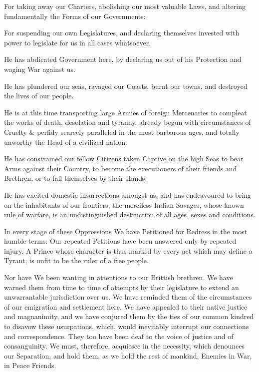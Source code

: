 \documentclass[a4paper,landscape,10pt]{article}
\begin{document}
For taking away our Charters,
abolishing our most valuable Laws,
and altering fundamentally the Forms of our Governments:

For suspending our own Legislatures,
and declaring themselves invested with power to legislate for us in all cases whatsoever.

He has abdicated Government here,
by declaring us out of his Protection and waging War against us.

He has plundered our seas,
ravaged our Coasts,
burnt our towns,
and destroyed the lives of our people.

He is at this time transporting large Armies of foreign Mercenaries
to compleat the works of death, desolation and tyranny,
already begun with circumstances of Cruelty \& perfidy
scarcely paralleled in the most barbarous ages,
and totally unworthy the Head of a civilized nation.

He has constrained our fellow Citizens taken Captive on the high Seas
to bear Arms against their Country,
to become the executioners of their friends and Brethren,
or to fall themselves by their Hands.

He has excited domestic insurrections amongst us,
and has endeavoured to bring on the inhabitants of our frontiers,
the merciless Indian Savages,
whose known rule of warfare,
is an undistinguished destruction of all ages, sexes and conditions.

In every stage of these Oppressions
We have Petitioned for Redress in the most humble terms:
Our repeated Petitions have been answered only by repeated injury.
A Prince whose character is thus marked by every act which may define a Tyrant,
is unfit to be the ruler of a free people.

Nor have We been wanting in attentions to our Brittish brethren.
We have warned them from time to time
of attempts by their legislature to extend an unwarrantable jurisdiction over us.
We have reminded them of the circumstances of our emigration and settlement here.
We have appealed to their native justice and magnanimity,
and we have conjured them by the ties of our common kindred to disavow these usurpations,
which, would inevitably interrupt our connections and correspondence.
They too have been deaf to the voice of justice and of consanguinity.
We must, therefore, acquiesce in the necessity,
which denounces our Separation,
and hold them, as we hold the rest of mankind,
Enemies in War, in Peace Friends.
\end{document}
